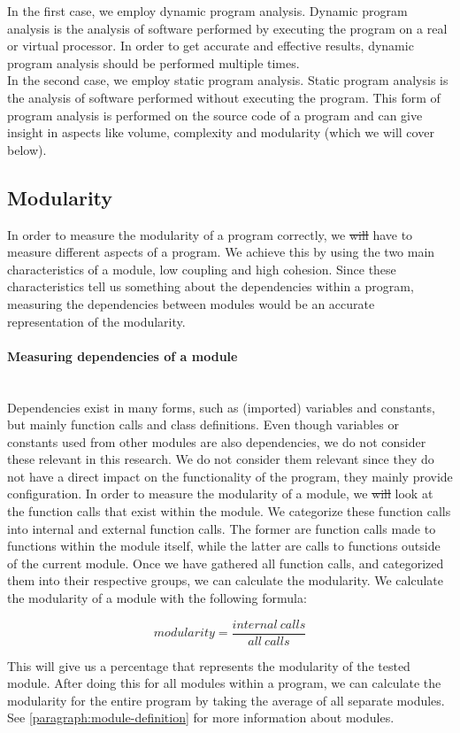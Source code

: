 \documentclass[twoside]{uva-inf-bachelor-thesis}
\newcommand{\myparagraph}[1]{\paragraph{#1}\mbox{}\\}
\begin{document}
In the first case, we employ dynamic program analysis\cite{nielson2015principles}.
Dynamic program analysis is the analysis of software performed by executing the program on a real or virtual processor. In order to get accurate and effective results, dynamic program analysis should be performed multiple times.\\

In the second case, we employ static program analysis\cite{nielson2015principles}.
Static program analysis is the analysis of software performed without executing the program. This form of program analysis is performed on the source code of a program and can give insight in aspects like volume, complexity and modularity (which we will cover below).

\subsection{Modularity}
In order to measure the modularity of a program correctly, we \sout{will} have to measure different aspects of a program. We achieve this by using the two main characteristics of a module, low coupling and high cohesion. Since these characteristics tell us something about the dependencies within a program, measuring the dependencies between modules would be an accurate representation of the modularity.  

\myparagraph{Measuring dependencies of a module}
Dependencies exist in many forms, such as (imported) variables and constants, but mainly function calls and class definitions. Even though variables or constants used from other modules are also dependencies, we do not consider these relevant in this research. We do not consider them relevant since they do not have a direct impact on the functionality of the program, they mainly provide configuration. In order to measure the modularity of a module, we \sout{will} look at the function calls that exist within the module. We categorize these function calls into internal and external function calls. The former are function calls made to functions within the module itself, while the latter are calls to functions outside of the current module. Once we have gathered all function calls, and categorized them into their respective groups, we can calculate the modularity. We calculate the modularity of a module with the following formula:

\[ modularity = \dfrac{internal\ calls}{all\ calls} \]

This will give us a percentage that represents the modularity of the tested module. After doing this for all modules within a program, we can calculate the modularity for the entire program by taking the average of all separate modules. See \autoref{paragraph:module-definition} for more information about modules.
\end{document}
